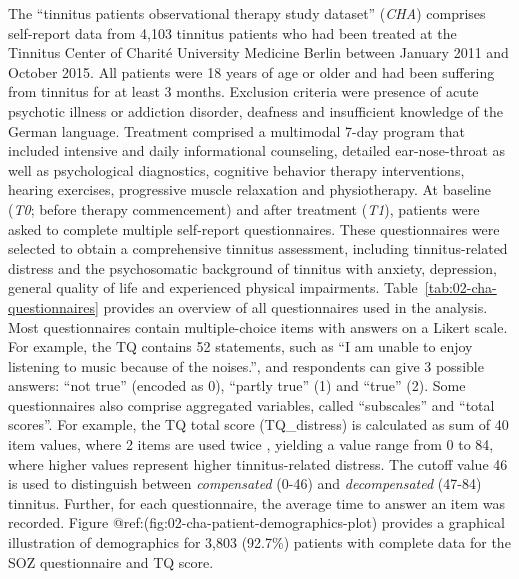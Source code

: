 \documentclass[
  oneside]{book}
\begin{document}
The ``tinnitus patients observational therapy study dataset'' (\emph{CHA}) comprises self-report data from 4,103 tinnitus patients who had been treated at the Tinnitus Center of Charité University Medicine Berlin between January 2011 and October 2015.
All patients were 18 years of age or older and had been suffering from tinnitus for at least 3 months.
Exclusion criteria were presence of acute psychotic illness or addiction disorder, deafness and insufficient knowledge of the German language.
Treatment comprised a multimodal 7-day program that included intensive and daily informational counseling, detailed ear-nose-throat as well as psychological diagnostics, cognitive behavior therapy interventions, hearing exercises, progressive muscle relaxation and physiotherapy.
At baseline (\emph{T0}; before therapy commencement) and after treatment (\emph{T1}), patients were asked to complete multiple self-report questionnaires.
These questionnaires were selected to obtain a comprehensive tinnitus assessment, including tinnitus-related distress and the psychosomatic background of tinnitus with anxiety, depression, general quality of life and experienced physical impairments.
Table~\ref{tab:02-cha-questionnaires} provides an overview of all questionnaires used in the analysis.
Most questionnaires contain multiple-choice items with answers on a Likert scale. For example, the TQ contains 52 statements, such as ``I am unable to enjoy listening to music because of the noises.'', and respondents can give 3 possible answers: ``not true'' (encoded as 0), ``partly true'' (1) and ``true'' (2).
Some questionnaires also comprise aggregated variables, called ``subscales'' and ``total scores''.
For example, the TQ total score (TQ\_distress) is calculated as sum of 40 item values, where 2 items are used twice \autocite{GoebelHiller:TF1998}, yielding a value range from 0 to 84, where higher values represent higher tinnitus-related distress.
The cutoff value 46 \autocite{GoebelHiller:TF1998} is used to distinguish between \emph{compensated} (0-46) and \emph{decompensated} (47-84) tinnitus.
Further, for each questionnaire, the average time to answer an item was recorded. Figure @ref:(fig:02-cha-patient-demographics-plot) provides a graphical illustration of demographics for 3,803 (92.7\%) patients with complete data for the SOZ questionnaire and TQ score.
\end{document}
